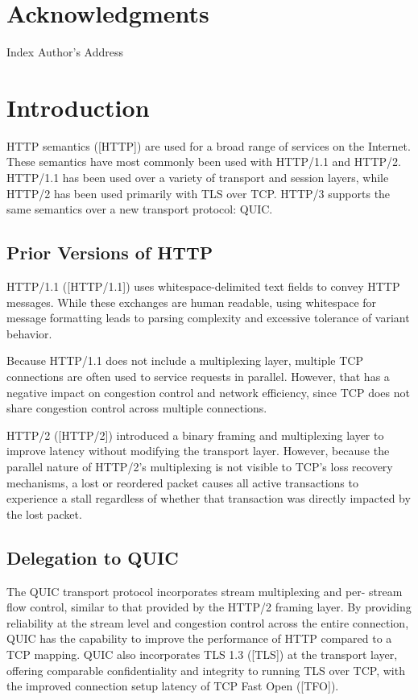 \documentclass{article}
\begin{document}
\section*{Acknowledgments}

Index Author's Address

\section{Introduction}

HTTP semantics ([HTTP]) are used for a broad range of services on the Internet.  These semantics have most commonly been used with HTTP/1.1 and HTTP/2.  HTTP/1.1 has been used over a variety of transport and session layers, while HTTP/2 has been used primarily with TLS over TCP.  HTTP/3 supports the same semantics over a new transport protocol: QUIC.

\subsection{Prior Versions of HTTP}

HTTP/1.1 ([HTTP/1.1]) uses whitespace-delimited text fields to convey HTTP messages.  While these exchanges are human readable, using whitespace for message formatting leads to parsing complexity and excessive tolerance of variant behavior.

Because HTTP/1.1 does not include a multiplexing layer, multiple TCP connections are often used to service requests in parallel.  However, that has a negative impact on congestion control and network efficiency, since TCP does not share congestion control across multiple connections.

HTTP/2 ([HTTP/2]) introduced a binary framing and multiplexing layer to improve latency without modifying the transport layer.  However, because the parallel nature of HTTP/2's multiplexing is not visible to TCP's loss recovery mechanisms, a lost or reordered packet causes all active transactions to experience a stall regardless of whether that transaction was directly impacted by the lost packet.

\subsection{Delegation to QUIC}

The QUIC transport protocol incorporates stream multiplexing and per- stream flow control, similar to that provided by the HTTP/2 framing layer.  By providing reliability at the stream level and congestion control across the entire connection, QUIC has the capability to improve the performance of HTTP compared to a TCP mapping.  QUIC also incorporates TLS 1.3 ([TLS]) at the transport layer, offering comparable confidentiality and integrity to running TLS over TCP, with the improved connection setup latency of TCP Fast Open ([TFO]).
\end{document}
